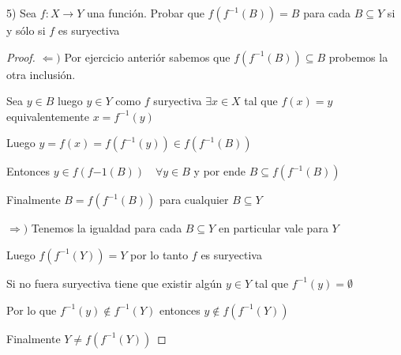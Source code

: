 \documentclass[12pt]{article}
\newcommand{\Ra}{\Rightarrow}
\newcommand{\ra}{\rightarrow}
\theoremstyle{definition}
\begin{document}
5) Sea $f: X \ra Y$ una función. Probar que $f(f^{-1}(B)) = B$ para cada $B \subseteq Y$ si y sólo si $f$ es suryectiva

\begin{proof}
 $\Leftarrow)$ Por ejercicio anteriór sabemos que $f(f^{-1}(B)) \subseteq B $ probemos la otra inclusión.

  Sea $y \in B$ luego $y \in Y$ como $f$ suryectiva $\exists x \in X$ tal que $f(x) = y$ equivalentemente $x = f^{-1}(y)$

  Luego $y = f(x) = f(f^{-1}(y)) \in f(f^{-1}(B)) $

  Entonces $y \in f(f{-1}(B)) \quad \forall y \in B $ y por ende $B \subseteq f(f^{-1}(B))$ 

  Finalmente $B = f(f^{-1}(B)) $ para cualquier $B \subseteq Y$

  $\Ra )$ Tenemos la igualdad para cada $B \subseteq Y$ en particular vale para $Y$ 

  Luego $f(f^{-1}(Y)) = Y$ por lo tanto $f$ es suryectiva 

  Si no fuera suryectiva tiene que existir algún $y \in Y$ tal que $f^{-1}(y) = \emptyset$ 

  Por lo que $f^{-1}(y) \notin f^{-1}(Y)$ entonces $y \notin f(f^{-1}(Y))$

  Finalmente $Y \neq f(f^{-1}(Y))$
\end{proof}
\end{document}
